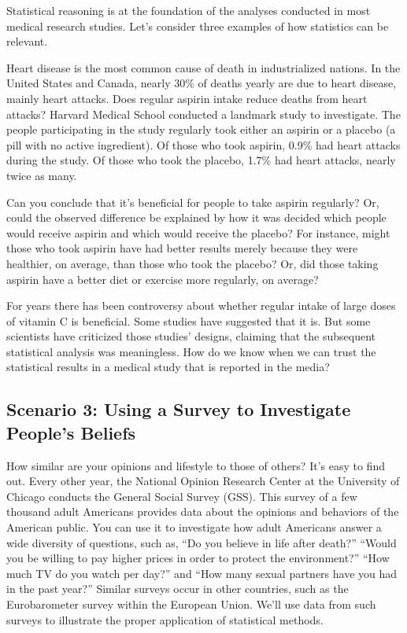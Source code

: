 Statistical reasoning is at the foundation of the analyses conducted in most medical research studies. Let’s consider three examples of how statistics can be relevant.

Heart disease is the most common cause of death in industrialized nations. In the United States and Canada, nearly 30\% of deaths yearly are due to heart disease, mainly heart attacks. Does regular aspirin intake reduce deaths from heart attacks? Harvard Medical School conducted a landmark study to investigate. The people participating in the study regularly took either an aspirin or a placebo (a pill with no active ingredient). Of those who took aspirin, 0.9\% had heart attacks during the study. Of those who took the placebo, 1.7\% had heart attacks, nearly twice as many.

Can you conclude that it’s beneficial for people to take aspirin regularly? Or, could the observed difference be explained by how it was decided which people would receive aspirin and which would receive the placebo? For instance, might those who took aspirin have had better results merely because they were healthier, on average, than those who took the placebo? Or, did those taking aspirin have a better diet or exercise more regularly, on average?

For years there has been controversy about whether regular intake of large doses of vitamin C is beneficial. Some studies have suggested that it is. But some scientists have criticized those studies’ designs, claiming that the subsequent statistical analysis was meaningless. How do we know when we can trust the statistical results in a medical study that is reported in the media?

\subsection*{Scenario 3: Using a Survey to Investigate People’s Beliefs}

How similar are your opinions and lifestyle to those of others? It’s easy to find out. Every other year, the National Opinion Research Center at the University of Chicago conducts the General Social Survey (GSS). This survey of a few thousand adult Americans provides data about the opinions and behaviors of the American public. You can use it to investigate how adult Americans answer a wide diversity of questions, such as, “Do you believe in life after death?” “Would you be willing to pay higher prices in order to protect the environment?” “How much TV do you watch per day?” and “How many sexual partners have you had in the past year?” Similar surveys occur in other countries, such as the Eurobarometer survey within the European Union. We’ll use data from such surveys to illustrate the proper application of statistical methods.


